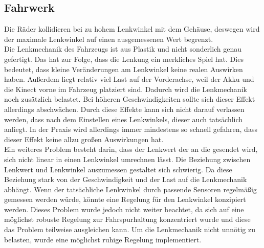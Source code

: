 \subsection{Fahrwerk}
\label{sec:fahrwerk}
Die Räder kollidieren bei zu hohem Lenkwinkel mit dem Gehäuse, deswegen wird der maximale Lenkwinkel auf einen ausgemessenen Wert begrenzt.
\\
Die Lenkmechanik des Fahrzeugs ist aus Plastik und nicht sonderlich genau gefertigt.
Das hat zur Folge, dass die Lenkung ein merkliches Spiel hat. 
Dies bedeutet, dass kleine Veränderungen am Lenkwinkel keine realen Auswirken haben. 
Außerdem liegt relativ viel Last auf der Vorderachse, weil der Akku und die Kinect vorne im Fahrzeug platziert sind.
Dadurch wird die Lenkmechanik noch zusätzlich belastet.
Bei höheren Geschwindigkeiten sollte sich dieser Effekt allerdings abschwächen. 
Durch diese Effekte kann sich nicht darauf verlassen werden, dass nach dem Einstellen eines Lenkwinkels, dieser auch tatsächlich anliegt.
In der Praxis wird allerdings immer mindestens so schnell gefahren, dass dieser Effekt keine allzu großen Auswirkungen hat.
\\
Ein weiteres Problem besteht darin, dass der Lenkwert der an die  gesendet wird, sich nicht linear in einen Lenkwinkel umrechnen lässt.
Die Beziehung zwischen Lenkwert und Lenkwinkel auszumessen gestaltet sich schwierig.
Da diese Beziehung stark von der Geschwindigkeit und der Last auf die Lenkmechanik abhängt.
Wenn der tatsächliche Lenkwinkel durch passende Sensoren regelmäßig gemessen werden würde, könnte eine Regelung für den Lenkwinkel konzipiert werden.
Dieses Problem wurde jedoch nicht weiter beachtet, da sich auf eine möglichst robuste Regelung zur Fahrspurhaltung konzentriert wurde und diese das Problem teilweise ausgleichen kann. 
Um die Lenkmechanik nicht unnötig zu belasten, wurde eine möglichst ruhige Regelung implementiert.





